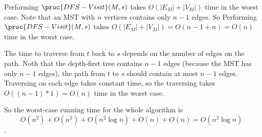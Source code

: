 \documentclass[11pt, answers]{exam}
\theoremstyle{plain}
\theoremstyle{definition}
\begin{document}
\begin{questions}
\begin{solution}
\begin{parts}
Performing $\proc{DFS-Visit}(M,s)$ takes $O(|E_M|+|V_M|)$ time in the worst case. Note that an MST with $n$ vertices contains only $n-1$ edges. So Performing $\proc{DFS-Visit}(M,s)$ takes $O(|E_M|+|V_M|) = O(n-1+n) = O(n)$ time in the worst case.

The time to traverse from $t$ back to $s$ depends on the number of edges on the path. Noth that the depth-first tree contains $n-1$ edges (because the MST has only $n-1$ edges), the path from $t$ to $s$ should contain at most $n-1$ edges. Traversing on each edge takes constant time, so the traversing takes $O((n-1)*1)= O(n)$ time in the worst case.

So the worst-case running time for the whole algorithm is 
$$O(n^2) + O(n^2) + O(n^2 \log{n}) + O(n) + O(n) =  O(n^2 \log{n})$$.

\end{parts}
\end{solution}

\end{questions}
\end{document}
